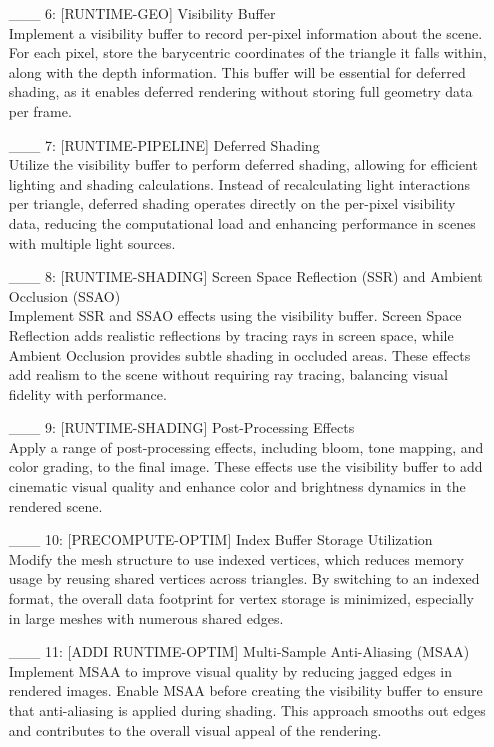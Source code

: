 \documentclass {article}
\begin{document}
\begin{enumerate}
     \item[\_\_\_ 6:]  [RUNTIME-GEO] Visibility Buffer
     \\ Implement a visibility buffer to record per-pixel information about the scene. For each pixel, store the barycentric 
     coordinates of the triangle it falls within, along with the depth information. This buffer will be essential for deferred 
     shading, as it enables deferred rendering without storing full geometry data per frame.
 
     \item[\_\_\_ 7:]  [RUNTIME-PIPELINE] Deferred Shading
     \\ Utilize the visibility buffer to perform deferred shading, allowing for efficient lighting and shading calculations. 
     Instead of recalculating light interactions per triangle, deferred shading operates directly on the per-pixel visibility 
     data, reducing the computational load and enhancing performance in scenes with multiple light sources.
 
     \item[\_\_\_ 8:]  [RUNTIME-SHADING] Screen Space Reflection (SSR) and Ambient Occlusion (SSAO)
     \\ Implement SSR and SSAO effects using the visibility buffer. Screen Space Reflection adds realistic reflections by tracing 
     rays in screen space, while Ambient Occlusion provides subtle shading in occluded areas. These effects add realism to the 
     scene without requiring ray tracing, balancing visual fidelity with performance.
 
     \item[\_\_\_ 9:]  [RUNTIME-SHADING] Post-Processing Effects
     \\ Apply a range of post-processing effects, including bloom, tone mapping, and color grading, to the final image. These 
     effects use the visibility buffer to add cinematic visual quality and enhance color and brightness dynamics in the rendered scene.
 
     \item[\_\_\_ 10:]  [PRECOMPUTE-OPTIM] Index Buffer Storage Utilization
     \\ Modify the mesh structure to use indexed vertices, which reduces memory usage by reusing shared vertices across triangles. 
     By switching to an indexed format, the overall data footprint for vertex storage is minimized, especially in large meshes with 
     numerous shared edges.
 
     \item[\_\_\_ 11:]  [ADDI RUNTIME-OPTIM] Multi-Sample Anti-Aliasing (MSAA)
     \\ Implement MSAA to improve visual quality by reducing jagged edges in rendered images. Enable MSAA before creating the 
     visibility buffer to ensure that anti-aliasing is applied during shading. This approach smooths out edges and contributes to 
     the overall visual appeal of the rendering.
 

\end{enumerate}
\end{document}
